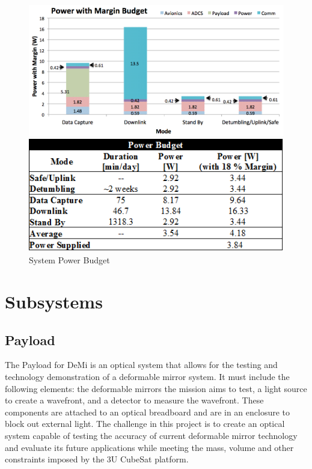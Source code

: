 \documentclass[12pt]{article}
\begin{document}
			
			\begin{figure}[!ht]
				\centering
				\includegraphics[width=5in]{images/MissionOverview_4.png}
				
				\includegraphics[width=5in]{images/MissionOverview_6.png}
				\caption{System Power Budget}
				\label{fig:Mission_power2}
			\end{figure}
\newpage			
\section{Subsystems}

\FloatBarrier

		\subsection{Payload}
The Payload for DeMi is an optical system that allows for the testing
and technology demonstration of a deformable mirror system.  It must include the following  elements: the deformable mirrors the
mission aims to test, a light source to create a wavefront, and a detector to measure the wavefront.  These components are attached
to an optical breadboard and are in an enclosure to block out external
light.  The challenge in this project is to create an optical system capable of testing the accuracy of current deformable mirror technology and evaluate its future applications while meeting the mass, volume and other constraints imposed by the 3U CubeSat platform.
			
\end{document}

